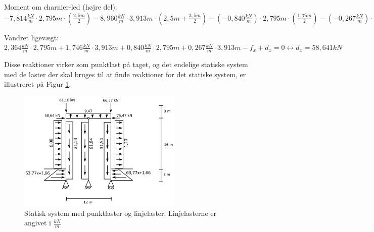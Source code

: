 \begin{center}
	Moment om charnier-led (højre del): $- 7,\!814 \frac{kN}{m} \cdot 2,\!795 m \cdot (\frac{2,\!5 m}{2}) - 8,\!960 \frac{kN}{m} \cdot 3,\!913 m \cdot (2,\!5 m + \frac{3,\!5 m}{2}) - (-0,\!840 \frac{kN}{m}) \cdot 2,\!795 m \cdot (\frac{1,\!75 m}{2}) - (- 0,\!267 \frac{kN}{m}) \cdot 3,\!913 m \cdot (1,\!75 m + \frac{1,\!25 m}{2}) + f_y \cdot 6 m - f_x \cdot 3 m = 0 \leftrightarrow f_x = 75,\!474 kN$
\end{center}

\begin{center}
	Vandret ligevægt: $2,\!364 \frac{kN}{m} \cdot 2,\!795 m + 1,\!746 \frac{kN}{m} \cdot 3,\!913 m + 0,\!840 \frac{kN}{m} \cdot 2,\!795 m + 0,\!267 \frac{kN}{m} \cdot 3,\!913 m - f_x + d_x = 0 \leftrightarrow d_x = 58,\!641 kN$
\end{center}

Disse reaktioner virker som punktlast på taget, og det endelige statiske system med de laster der skal bruges til at finde reaktioner for det statiske system, er illustreret på Figur \ref{fig:alle}. 

\begin{figure}[htbp]
	\centering
	\includegraphics[width=0.7\textwidth]{billeder/endeligesystemmedlaster.png}
	\caption{Statisk system med punktlaster og linjelaster. Linjelasterne er angivet i $\frac{kN}{m}$}
	\label{fig:alle}
\end{figure}
